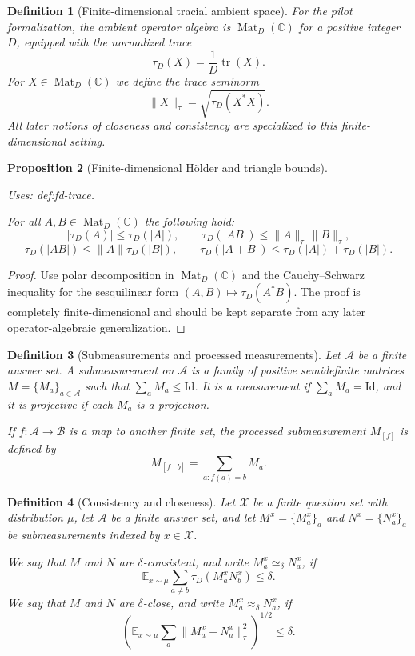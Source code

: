 \documentclass{article}
\providecommand{\uses}[1]{\par\smallskip\noindent\emph{Uses:} #1.\par\smallskip}
\newtheorem{definition}{Definition}[section]
\newtheorem{proposition}[definition]{Proposition}
\theoremstyle{remark}
\newcommand{\C}{\mathbb{C}}
\newcommand{\E}{\mathbb{E}}
\newcommand{\id}{\mathrm{Id}}
\newcommand{\tr}{\operatorname{tr}}
\newcommand{\Mat}{\operatorname{Mat}}
\begin{document}
\begin{definition}[Finite-dimensional tracial ambient space]\label{def:fd-trace}
  For the pilot formalization, the ambient operator algebra is $\Mat_D(\C)$ for a positive integer $D$, equipped with the normalized trace
  \[
    \tau_D(X)=\frac{1}{D} \tr(X).
  \]
  For $X\in\Mat_D(\C)$ we define the trace seminorm
  \[
    \|X\|_\tau = \sqrt{\tau_D(X^*X)}.
  \]
  All later notions of closeness and consistency are specialized to this finite-dimensional setting.
\end{definition}

\begin{proposition}[Finite-dimensional H\"older and triangle bounds]\label{prop:holder}
  \uses{def:fd-trace}
  For all $A,B\in \Mat_D(\C)$ the following hold:
  \[
    |\tau_D(A)| \le \tau_D(|A|),\qquad
    \tau_D(|AB|) \le \|A\|_\tau\,\|B\|_\tau,
  \]
  \[
    \tau_D(|AB|) \le \|A\| \tau_D(|B|),\qquad
    \tau_D(|A+B|) \le \tau_D(|A|)+\tau_D(|B|).
  \]
\end{proposition}
\begin{proof}
  Use polar decomposition in $\Mat_D(\C)$ and the Cauchy--Schwarz inequality for the sesquilinear form $(A,B)\mapsto \tau_D(A^*B)$. The proof is completely finite-dimensional and should be kept separate from any later operator-algebraic generalization.
\end{proof}

\begin{definition}[Submeasurements and processed measurements]\label{def:submeasurement}
  Let $\mathcal A$ be a finite answer set.
  A \emph{submeasurement} on $\mathcal A$ is a family of positive semidefinite matrices $M=\{M_a\}_{a\in\mathcal A}$ such that $\sum_a M_a\le \id$. It is a \emph{measurement} if $\sum_a M_a=\id$, and it is \emph{projective} if each $M_a$ is a projection.

  If $f\colon \mathcal A\to \mathcal B$ is a map to another finite set, the \emph{processed submeasurement} $M_{[f]}$ is defined by
  \[
    M_{[f\mid b]} = \sum_{a:f(a)=b} M_a.
  \]
\end{definition}

\begin{definition}[Consistency and closeness]\label{def:consistency}
  Let $\mathcal X$ be a finite question set with distribution $\mu$, let $\mathcal A$ be a finite answer set, and let $M^x=\{M^x_a\}_a$ and $N^x=\{N^x_a\}_a$ be submeasurements indexed by $x\in\mathcal X$.

  We say that $M$ and $N$ are \emph{$\delta$-consistent}, and write $M^x_a\simeq_\delta N^x_a$, if
  \[
    \E_{x\sim\mu}\sum_{a\ne b}\tau_D(M^x_aN^x_b)\le \delta.
  \]
  We say that $M$ and $N$ are \emph{$\delta$-close}, and write $M^x_a\approx_\delta N^x_a$, if
  \[
    \left(\E_{x\sim\mu}\sum_a \|M^x_a-N^x_a\|_\tau^2\right)^{1/2}\le \delta.
  \]
\end{definition}
\end{document}

